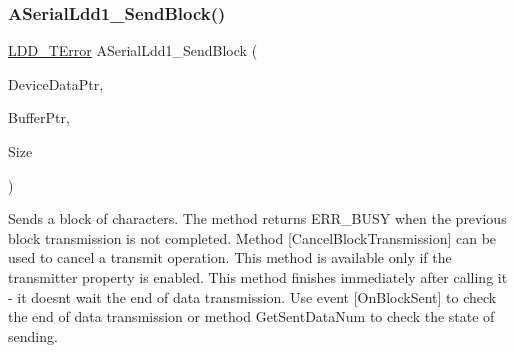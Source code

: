 \subsubsection{\texorpdfstring{A\+Serial\+Ldd1\+\_\+\+Send\+Block()}{ASerialLdd1\_SendBlock()}}
{\footnotesize\ttfamily \hyperlink{group___p_e___types__module_ga24c2b045fd04e79e85f261ce4df35588}{L\+D\+D\+\_\+\+T\+Error} A\+Serial\+Ldd1\+\_\+\+Send\+Block (\begin{DoxyParamCaption}\item[{\hyperlink{group___p_e___types__module_gac5cf1362f1f0e3a2ce71b1bf2276d091}{L\+D\+D\+\_\+\+T\+Device\+Data} $\ast$}]{Device\+Data\+Ptr,  }\item[{\hyperlink{group___p_e___types__module_gade8ef9401405bd941b6da738b807f980}{L\+D\+D\+\_\+\+T\+Data} $\ast$}]{Buffer\+Ptr,  }\item[{uint16\+\_\+t}]{Size }\end{DoxyParamCaption})}



Sends a block of characters. The method returns E\+R\+R\+\_\+\+B\+U\+SY when the previous block transmission is not completed. Method \mbox{[}Cancel\+Block\+Transmission\mbox{]} can be used to cancel a transmit operation. This method is available only if the transmitter property is enabled. This method finishes immediately after calling it -\/ it doesn\textquotesingle{}t wait the end of data transmission. Use event \mbox{[}On\+Block\+Sent\mbox{]} to check the end of data transmission or method Get\+Sent\+Data\+Num to check the state of sending. 


